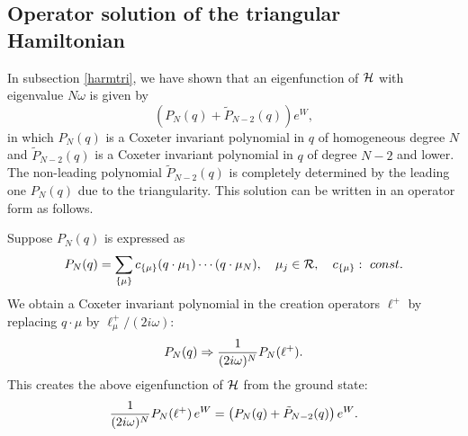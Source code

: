 \documentclass[a4paper,12pt]{article}
\begin{document}
\subsection{Operator solution of the triangular Hamiltonian}
\label{PNcreationop}
In subsection \ref{harmtri}, we have shown that an eigenfunction of
\({\cal H}\) with eigenvalue \(N\omega\) is given by
\begin{equation}
\left(P_N(q)+\tilde{P}_{N-2}(q)\right)e^W,
\end{equation}
in which \(P_N(q)\) is a Coxeter invariant polynomial in \(q\)
of homogeneous
degree \(N\) and \(\tilde{P}_{N-2}(q)\) is a Coxeter invariant
polynomial in
\(q\) of degree \(N-2\) and lower. The non-leading polynomial
\(\tilde{P}_{N-2}(q)\) is completely determined by the leading one
\(P_N(q)\) due to the triangularity.
This solution can be written in an operator form as follows.

Suppose \(P_N(q)\) is expressed as
\begin{equation}
   P_N(q)=\sum_{\{\mu\}}c_{\{\mu\}}(q\cdot\mu_1)\cdots(q\cdot\mu_N),
   \quad \mu_j\in{\cal R},\quad c_{\{\mu\}}:\ const.
\end{equation}
We obtain a Coxeter invariant polynomial
in the creation operators \(\ell^+\)
by replacing \(q\cdot\mu\) by \(\ell^+_\mu/(2i\omega)\):
\[
   P_N(q)\Rightarrow {1\over{(2i\omega)^N}}P_N(\ell^+).
\]
This creates the above eigenfunction of \({\cal H}\) from the ground
state:
\begin{equation}
   {1\over{(2i\omega)^N}}P_N(\ell^+)\,e^W=
   \left(P_N(q)+\tilde{P}_{N-2}(q)\right)e^W.
   \label{pncreate}
\end{equation}
\end{document}
